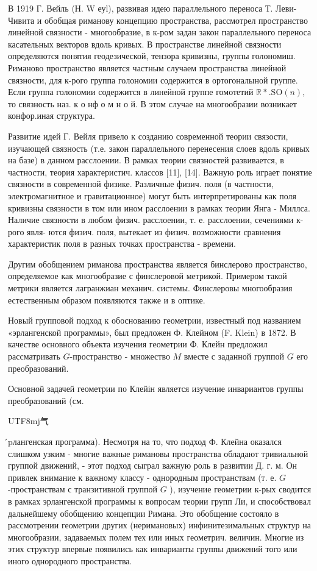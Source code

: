 \documentclass[10pt]{article}
\begin{document}
В 1919 Г. Вейль (Н. W еуl), развивая идею параллельного переноса Т. Леви-Чивита и обобщая риманову концепцию пространства, рассмотрел пространство линейной связности - многообразие, в к-ром задан закон параллельного переноса касательных векторов вдоль кривых. В пространстве линейной связности определяются понятия геодезической, тензора кривизны, группы голономиш. Риманово пространство является частным случаем пространства линейной связности, для к-рого группа голономии содержится в ортогоналыной группе. Если группа голономии содержится в линейной группе гомотетий $\mathbb{R} * . \mathrm{SO}(n)$, то связность наз. к о нф о м н о й. В этом случае на многообразии возникает конфор.иная структура.



Развитие идей Г. Вейля привело к созданию современной теории связости, изучающей связность (т.е. закон параллельного перенесения слоев вдоль кривых на базе) в данном расслоении. В рамках теории связностей развивается, в частности, теория характеристич. классов [11], [14]. Важную роль играет понятие связности в современной физике. Различные физич. поля (в частности, электромагнитное и гравитационное) могут быть интерпретированы как поля кривизны связности в том или ином расслоении в рамках теории Янга - Миллса. Наличие связности в любом физич. расслоении, т. е. расслоении, сечениями к-рого явля- ются физич. поля, вытекает из физич. возможности сравнения характеристик поля в разных точках пространства - времени.



Другим обобщением риманова пространства является бинслерово пространство, определяемое как многообразие с финслеровой метрикой. Примером такой метрики является лагранжиан механич. системы. Финслеровы многообразия естественным образом появляются также и в оптике.



Новый групповой подход к обоснованию геометрии, известный под названием «эрлангенской программы», был предложен Ф. Клейном (F. Klein) в 1872. В качестве основного объекта изучения геометрии Ф. Клейн предложил рассматривать $G$-пространство - множество $M$ вместе с заданной группой $G$ его преобразований.



Основной задачей геометрии по Клейін является изучение инвариантов группы преобразований (см. \begin{CJK}{UTF8}{mj}气\end{CJK}́pлангенская программа). Несмотря на то, что подход Ф. Клейна оказался слишком узким - многие важные римановы пространства обладают тривиальной группой движений, - этот подход сыграл важную роль в развитии Д. г. м. Он привлек внимание к важному классу - однородным пространствам (т. е. $G$-пространствам с транзитивной группой $G$ ), изучение геометрии к-рых сводится в рамках эрлангенской программы к вопросам теории групп Ли, и способствовал дальнейшему обобщению концепции Римана. Это обобщение состояло в рассмотрении геометрии других (неримановых) инфинитезимальных структур на многообразии, задаваемых полем тех или иных геометрич. величин. Многие из этих структур впервые появились как инварианты группы движений того или иного однородного пространства.
\end{document}
